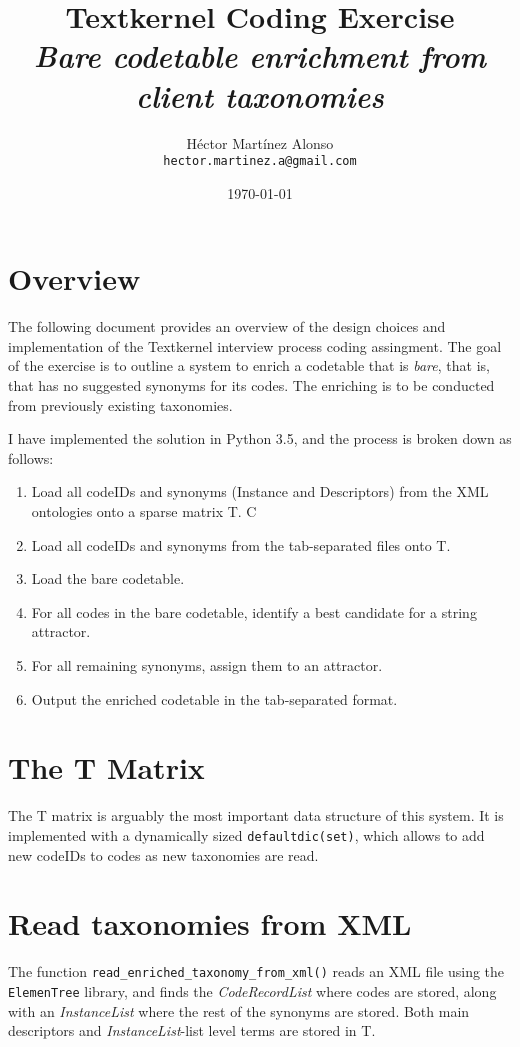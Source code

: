 \documentclass[12pt]{article}%
\begin{document}
\title{Textkernel Coding Exercise\\ \textit{Bare codetable enrichment from client taxonomies}}
\author{Héctor Martínez Alonso\\ \texttt{hector.martinez.a@gmail.com}}
\date{\today}
\maketitle
\section{Overview}

The following document provides an overview of the design choices and implementation of the Textkernel interview process coding assingment. The goal of the exercise is to outline a system to enrich a codetable that is \textit{bare}, that is, that has no suggested synonyms for its codes. The enriching is to be conducted from previously existing taxonomies.

I have implemented the solution in Python 3.5, and the process is broken down as follows:

\begin{enumerate}
\item Load all codeIDs and synonyms (Instance and Descriptors) from the XML ontologies onto a sparse matrix T. C
\item Load all codeIDs and synonyms from the tab-separated files onto T.
\item Load the bare codetable.
\item For all codes in the bare codetable, identify a best candidate for a string attractor.
\item For all remaining synonyms, assign them to an attractor.
\item Output the enriched codetable in the tab-separated format.
\end{enumerate}
\section{The T Matrix}
The T matrix is arguably the most important data structure of this system. It is implemented with a dynamically sized \texttt{defaultdic(set)}, which allows to add new codeIDs to codes as new taxonomies are read.
\section{Read taxonomies from XML}
The function \texttt{read\_enriched\_taxonomy\_from\_xml()} reads an XML file using the \texttt{ElemenTree} library, and finds the \textit{CodeRecordList} where codes are stored, along with an \textit{InstanceList} where the rest of the synonyms are stored. Both main descriptors and \textit{InstanceList}-list level terms are stored in T.
\end{document}

